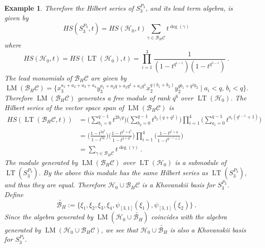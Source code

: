 \documentclass{amsart}
\newcommand{\HH}{\mathcal{H}}
\newcommand{\BH}{\mathcal{B}_H}
\newtheorem{example}[subsection]{Example}
\DeclareMathOperator{\lt}{LT}
\DeclareMathOperator{\LM}{LM}
\begin{document}
\begin{example}
Therefore the Hilbert series of $S_3^{P_3}$, and its lead term algebra, is given by 
$$HS(S_3^{P_3},t)=HS(\HH_0,t)  \sum_{\gamma \in \BH\mathcal{C}} t^{\deg(\gamma)}$$
where 
$$HS(\HH_0,t)=HS(\lt(\HH_0),t)=\prod_{i=1}^3\frac{1}{(1-t^{q^{i-1}})(1-t^{q^{5-i}})}\ . $$
The lead monomials of $\BH\mathcal{C}$ are given by
$$\LM(\BH\mathcal{C})=\{ x_3^{a_1+a_2+a_3+a_4}y_3^{a_1+a_2q+a_3q^2+a_4q^3}x_2^{q(b_1+b_2)}y_2^{qb_1+q^2b_2}\mid a_i<q,\, b_i<q\}.$$
Therefore $\LM(\BH\mathcal{C})$ generates a free module of rank $q^6$ over $\lt(\HH_0)$.
The Hilbert series of the vector space span of $\LM(\BH\mathcal{C})$ is 
\begin{align*}
HS(\lt(\BH\mathcal{C},t))&=\Big(\sum_{b_1=0}^{q-1} t^{2b_1 q}\Big) \Big(\sum_{b_2=0}^{q-1} t^{b_2 (q+q^2)}\Big)
\prod_{i=1}^4\Bigg(\sum_{a_i=0}^{q-1} t^{a_i(q^{i-1}+1)}\Bigg)\\
&= \Big(\frac{1-t^{2q^2}}{1- t^{2q}}\Big) \Big(\frac{1-t^{q^2+q^3}}{1-t^{q+q^2}}\Big) 
\prod_{i=1}^4\Bigg(\frac{1-t^{q^i+q}}{1-t^{q^{i-1}+1}}\Bigg)\\
&= \sum_{\gamma \in \BH\mathcal{C}} t^{\deg(\gamma)}\ .
\end{align*}
The module generated by $\LM(\BH\mathcal{C})$ over $\lt(\HH_0)$ is a submodule of 
$\lt(S_3^{P_3})$.  By the above this module has the same Hilbert series as 
$\lt(S_3^{P_3})$, and thus they are equal.  
Therefore $\HH_0 \cup \BH\mathcal{C}$ is a Khovanskii basis for $S_3^{P_3}$. 
Define $$\widetilde{\BH}:=\{\xi_1,\xi_2,\xi_3,\xi_4,\psi_{[3,1]}(\xi_1), \psi_{[3,1]}(\xi_2)\}\ .$$
Since the algebra generated by $\LM(\HH_0\cup\widetilde{\BH})$ coincides with the algebra generated by
$\LM(\HH_0\cup\BH\mathcal{C})$, we see that $\HH_0\cup\widetilde{\BH}$ is also a Khovanskii basis for $S_3^{P_3}$.

\end{example}
\end{document}
